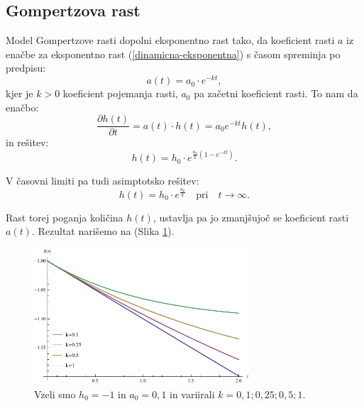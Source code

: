\documentclass[a4paper, twoside, 12pt]{book}
\begin{document}
    \subsection{Gompertzova rast}

    Model Gompertzove rasti dopolni eksponentno rast tako, da koeficient rasti $a$ iz enačbe za eksponentno rast (\ref{dinamicna-eksponentna}) s časom spreminja po predpisu:
    \begin{equation}
      a(t) = a_0 \cdot e^{- k t},
      \label{dinamicna-gompertzova-faktor}
    \end{equation}
kjer je $k > 0$ koeficient pojemanja rasti, $a_0$ pa začetni koeficient rasti.
To nam da enačbo:
    \begin{equation}
      \frac{\partial h(t)}{\partial t} = a(t) \cdot h(t) = a_0 e^{ -k t} h(t),
      \label{dinamicna-gompertzova}
    \end{equation}
in rešitev:
    \begin{equation}
      h(t) = h_0 \cdot e^{\frac{a_0}{k}(1-e^{-kt})}.
      \label{dinamicna-gompertzova-resitev}
    \end{equation}

V časovni limiti pa tudi asimptotsko rešitev:
    \begin{equation}
      h(t) = h_0 \cdot e^{\frac{a_0}{k}} \quad \text{pri} \quad t \rightarrow \infty.
      \label{dinamicna-gompertzova-limita}
    \end{equation}

Rast torej poganja količina $h(t)$, ustavlja pa jo zmanjšujoč se koeficient rasti $a(t)$. Rezultat narišemo na (Slika \ref{fig:gompertzova-rast}).

    \begin{figure}[h!]
      \begin{center}
        \includegraphics[width=8cm]{slike/gompertzova-rast}
      \end{center}
      \caption{Vzeli smo $h_0=-1$ in $a_0=0,1$ in variirali $k=0,1;0,25;0,5;1$.}
      \label{fig:gompertzova-rast}
    \end{figure}
\end{document}

